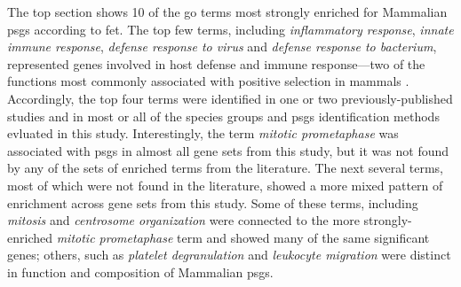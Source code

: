 The top section shows 10 of the \ac{go} terms most strongly enriched
for Mammalian \psgefive \acp{psg} according to \ac{fet}. The top few
terms, including \emph{inflammatory response}, \emph{innate immune
  response}, \emph{defense response to virus} and \emph{defense
  response to bacterium}, represented genes involved in host defense
and immune response---two of the functions most commonly associated
with positive selection in mammals \citep{Nielsen2005b}. Accordingly,
the top four terms were identified in one or two previously-published
studies and in most or all of the species groups and \acp{psg}
identification methods evluated in this study. Interestingly, the term
\emph{mitotic prometaphase} was associated with \acp{psg} in almost
all gene sets from this study, but it was not found by any of the sets
of enriched terms from the literature. The next several terms, most of
which were not found in the literature, showed a more mixed pattern of
enrichment across gene sets from this study. Some of these terms,
including \emph{mitosis} and \emph{centrosome organization} were
connected to the more strongly-enriched \emph{mitotic prometaphase}
term and showed many of the same significant genes; others, such as
\emph{platelet degranulation} and \emph{leukocyte migration} were
distinct in function and composition of Mammalian \psgefive \acp{psg}.

